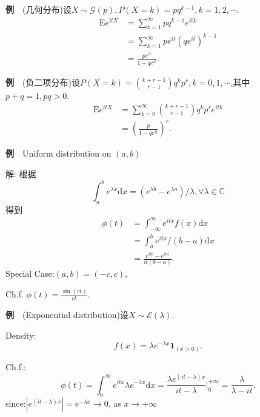 \begin{frame}
	\textbf{例}$\quad$(几何分布)设$X\sim\mathcal{G}(p),P(X=k)=pq^{k-1},k=1,2,\cdots.$
	\begin{equation}
	\begin{split}
	\mathrm{E}e^{itX} &= \sum_{k=1}^\infty pq^{k-1}e^{itk} \\
	&=\sum_{k=1}^\infty pe^{it}(qe^{it})^{k-1}\\
	&=\frac{pe^{it}}{1-qe^{it}}.
	\end{split}
	\end{equation}
	
	\textbf{例}$\quad$(负二项分布)设$P(X=k)=\binom{k+r-1}{r-1}q^kp^r,k=0,1,\cdots$,其中$p+q=1,pq>0.$
	\begin{equation}
	\begin{split}
	\mathrm{E}e^{itX} &= \sum_{k=0}^\infty \binom{k+r-1}{r-1}q^kp^re^{itk} \\
	&=\left(\frac{p}{1-qe^{it}}\right)^r.
	\end{split}
	\end{equation}
\end{frame}


\begin{frame}
	\textbf{例}$\quad$Uniform distribution on $(a,b)$
	
	解: 根据
	\begin{equation}
		\int_{a}^{b}e^{\lambda x}\mathrm{d}x = (e^{\lambda b}-e^{\lambda a})/\lambda,\forall \lambda\in\mathbb{C}
	\end{equation}	
	得到
	\begin{equation}
	\begin{split}
	\phi(t) &= \int_{-\infty}^\infty e^{itx}f(x)\mathrm{d}x \\
	&=\int_{a}^b e^{itx}/(b-a)\mathrm{d}x  \\
	&= \frac{e^{itb}-e^{ita}}{it(b-a)}.
	\end{split}
	\end{equation}
	Special Case:$(a,b)=(-c,c)$,
	
	Ch.f. $\phi(t) = \frac{\sin(ct)}{ct}$.
	
\end{frame}

\begin{frame}
	\textbf{例}$\quad$(Exponential distribution)设$X\sim\mathcal{E}(\lambda)$.
	
	Density:\begin{equation}
		f(x) =\lambda e^{-\lambda x}\bm{1}_{(x>0)}.
	\end{equation}

	Ch.f.:\begin{equation}
		\phi(t) = \int_{0}^\infty e^{itx}\lambda e^{-\lambda x}\mathrm{d}x = \frac{\lambda e^{(it-\lambda)x}}{it-\lambda}\bigg|^{+\infty}_0 = \frac{\lambda}{\lambda - it}.
	\end{equation}
	since:$|e^{(it-\lambda)x}| = e^{-\lambda x}\to 0$, as $x\to+\infty$

\end{frame}

